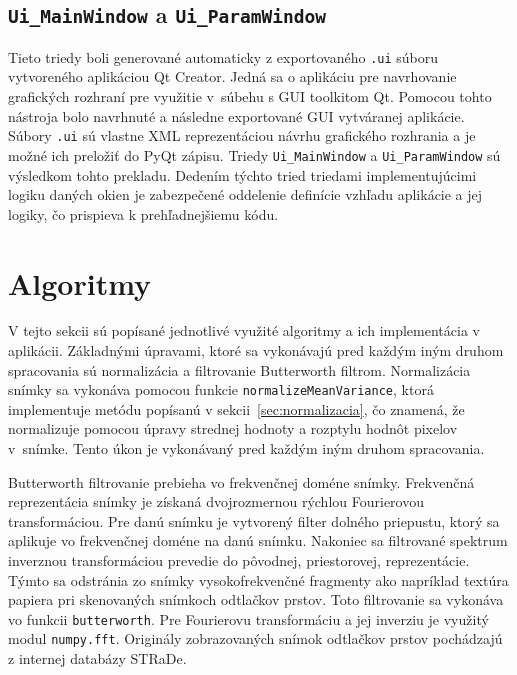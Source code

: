   \subsection{\texttt{Ui\_MainWindow} a \texttt{Ui\_ParamWindow}}
  Tieto triedy boli generované automaticky z exportovaného \texttt{.ui} súboru vytvoreného aplikáciou Qt Creator. Jedná sa o aplikáciu pre navrhovanie
  grafických rozhraní pre využitie v~súbehu s GUI toolkitom Qt. Pomocou tohto nástroja bolo navrhnuté a následne exportované GUI vytváranej aplikácie. Súbory
  \texttt{.ui} sú vlastne XML reprezentáciou návrhu grafického rozhrania a je možné ich preložiť do PyQt zápisu. Triedy \texttt{Ui\_MainWindow}
  a \texttt{Ui\_ParamWindow} sú výsledkom tohto prekladu. Dedením týchto tried triedami implementujúcimi logiku daných okien je zabezpečené oddelenie definície
  vzhľadu aplikácie a jej logiky, čo prispieva k prehľadnejšiemu kódu.

  \section{Algoritmy} \label{sec:algoritmy}
  V tejto sekcii sú popísané jednotlivé využité algoritmy a ich implementácia v aplikácii.
  Základnými úpravami, ktoré sa vykonávajú pred každým iným druhom spracovania sú normalizácia a filtrovanie Butterworth filtrom.
  Normalizácia snímky sa vykonáva pomocou funkcie \texttt{normalizeMeanVariance}, ktorá implementuje metódu
  popísanú v sekcii~{\ref{sec:normalizacia}}, čo znamená, že normalizuje pomocou úpravy strednej hodnoty a rozptylu hodnôt pixelov v~snímke. Tento úkon je
  vykonávaný pred každým iným druhom spracovania.

  Butterworth filtrovanie prebieha vo frekvenčnej doméne snímky. Frekvenčná reprezentácia snímky je získaná dvojrozmernou rýchlou Fourierovou transformáciou.
  Pre danú snímku je vytvorený filter dolného priepustu, ktorý sa aplikuje vo frekvenčnej doméne na danú snímku. Nakoniec sa filtrované spektrum inverznou
  transformáciou prevedie do pôvodnej, priestorovej, reprezentácie. Týmto sa odstránia zo snímky vysokofrekvenčné fragmenty ako napríklad textúra papiera
  pri skenovaných snímkoch odtlačkov prstov. Toto filtrovanie sa vykonáva vo funkcii \texttt{butterworth}. Pre Fourierovu transformáciu a jej
  inverziu je využitý modul \texttt{numpy.fft}. Originály zobrazovaných snímok odtlačkov prstov pochádzajú z internej databázy STRaDe.

